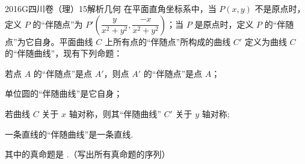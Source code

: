 
\begin{problem}{2016}{G}{四川卷（理）}{15}{解析几何}
在平面直角坐标系中，当 $ P(x,y) $ 不是原点时，定义 $ P $ 的“伴随点”为 $ P'\left(\dfrac{y}{x^2+y^2},\dfrac{-x}{x^2+y^2}\right) $；当 $ P $ 是原点时，定义 $ P $ 的“伴随点”为它自身。平面曲线 $ C $ 上所有点的“伴随点”所构成的曲线 $ C' $ 定义为曲线 $ C $ 的“伴随曲线”，现有下列命题：

 若点 $ A $ 的“伴随点”是点 $ A' $，则点 $ A' $ 的“伴随点”是点 $ A $；

 单位圆的“伴随曲线”是它自身；

 若曲线 $C$ 关于 $x$ 轴对称，则其“伴随曲线” $C'$ 关于  $y $ 轴对称;

 一条直线的“伴随曲线”是一条直线.

其中的真命题是 \underline{\hspace{4em}}.（写出所有真命题的序列）
\end{problem}

\begin{answer}

\end{answer}

\begin{solutions}

\end{solutions}